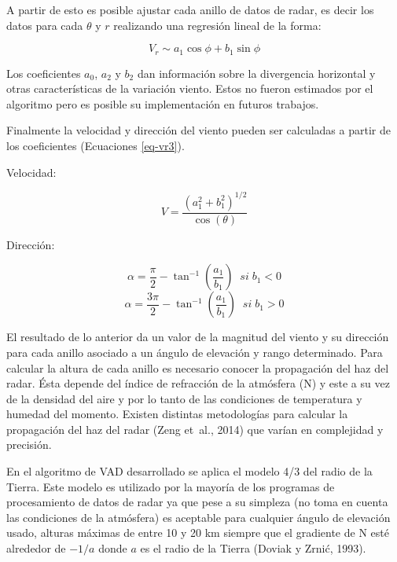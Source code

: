 \documentclass[12pt,spanish,oneside]{book}
\begin{document}
A partir de esto es posible ajustar cada anillo de datos de radar, es
decir los datos para cada \(\theta\) y \(r\) realizando una regresión
lineal de la forma:

\begin{equation}
\label{eq-vr4}
V_r \sim a_1\cos \phi + b_1 \sin \phi
\end{equation}

Los coeficientes \(a_0\), \(a_2\) y \(b_2\) dan información sobre la
divergencia horizontal y otras características de la variación viento.
Estos no fueron estimados por el algoritmo pero es posible su
implementación en futuros trabajos.

Finalmente la velocidad y dirección del viento pueden ser calculadas a
partir de los coeficientes (Ecuaciones \ref{eq-vr3}).

Velocidad:

\begin{equation}
\label{eq-vr5}
V = \frac{(a_{1}^{2} + b_{1}^{2})^{1/2}}{\cos(\theta)}
\end{equation}

Dirección:

\begin{equation}\label{eq-vr6}
\alpha = \frac{\pi}{2}-\tan^{-1}(\frac{a_1}{b_1}) \; \; si \; b_1 < 0 
\end{equation}\begin{equation}\label{eq-vr7}
\alpha = \frac{3\pi}{2}-\tan^{-1}(\frac{a_1}{b_1}) \; \; si \; b_1 > 0
\end{equation}

El resultado de lo anterior da un valor de la magnitud del viento y su
dirección para cada anillo asociado a un ángulo de elevación y rango
determinado. Para calcular la altura de cada anillo es necesario conocer
la propagación del haz del radar. Ésta depende del índice de refracción
de la atmósfera (N) y este a su vez de la densidad del aire y por lo
tanto de las condiciones de temperatura y humedad del momento. Existen
distintas metodologías para calcular la propagación del haz del radar
(Zeng et~al., 2014) que varían en complejidad y precisión.

En el algoritmo de VAD desarrollado se aplica el modelo 4/3 del radio de
la Tierra. Este modelo es utilizado por la mayoría de los programas de
procesamiento de datos de radar ya que pese a su simpleza (no toma en
cuenta las condiciones de la atmósfera) es aceptable para cualquier
ángulo de elevación usado, alturas máximas de entre 10 y 20 km siempre
que el gradiente de N esté alrededor de \(-1/a\) donde \(a\) es el radio
de la Tierra (Doviak y Zrnić, 1993).
\end{document}
